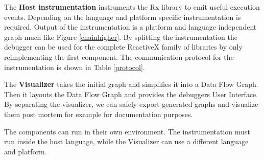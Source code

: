 The \textbf{Host instrumentation} instruments the Rx library to emit useful execution events. Depending on the language and platform specific instrumentation is required. Output of the instrumentation is a platform and language independent graph much like Figure \ref{chainhigher}. By splitting the instrumentation the debugger can be used for the complete ReactiveX family of libraries by only reimplementing the first component. The communication protocol for the instrumentation is shown in Table \ref{protocol}. 

The \textbf{Visualizer} takes the initial graph and simplifies it into a Data Flow Graph. Then it layouts the Data Flow Graph and provides the debuggers User Interface. By separating the visualizer, we can safely export generated graphs and visualize them post mortem for example for documentation purposes.

The components can run in their own environment. The instrumentation must run inside the host language, while the Visualizer can use a different language and platform.

\begin{figure*}
\texttt{[image: \{images/screenshot.mergeAll.crop]}.png}
\caption{Screenshot of \href{http://rxfiddle.net/\#type=editor&code=Y29uc3Qgc291cmNlMSA9IFJ4Lk9ic2VydmFibGUKICAub2YoMSwgMiwgMywgNCkKCmNvbnN0IHNvdXJjZTIgPSBSeC5PYnNlcnZhYmxlCiAgLm9mKCJhIiwgImIiLCAiYyIsICJkIikKClJ4Lk9ic2VydmFibGUKICAub2Yoc291cmNlMSwgc291cmNlMikKICAubWVyZ2VBbGwoKQogIC5za2lwKDIpCiAgLnN1YnNjcmliZSgp}{RxFiddle.net}}
\label{screenshot-mergeAll}
\end{figure*}

